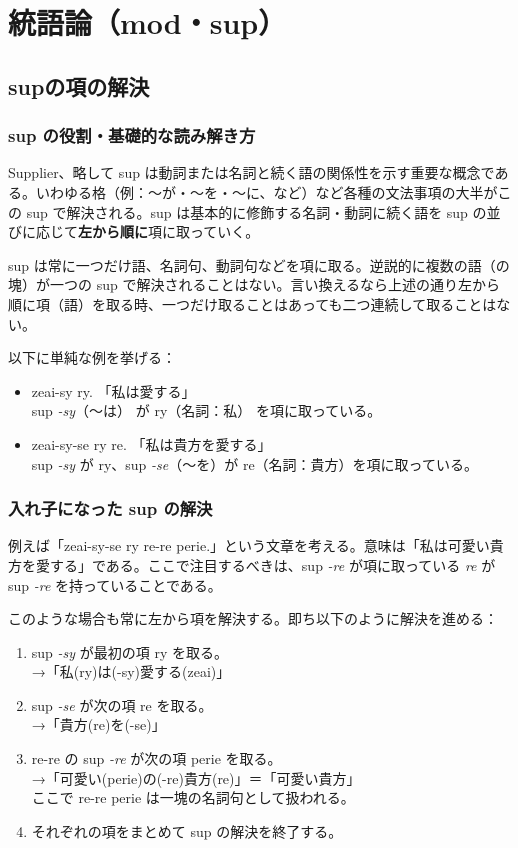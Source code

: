 \chapter{統語論（mod・sup）}

\section{supの項の解決}

\subsection{sup の役割・基礎的な読み解き方}

Supplier、略して sup は動詞または名詞と続く語の関係性を示す重要な概念である。いわゆる格（例：～が・～を・～に、など）など各種の文法事項の大半がこの sup で解決される。sup は基本的に修飾する名詞・動詞に続く語を sup の並びに応じて\textbf{左から順に}項に取っていく。

sup は常に一つだけ語、名詞句、動詞句などを項に取る。逆説的に複数の語（の塊）が一つの sup で解決されることはない。言い換えるなら上述の通り左から順に項（語）を取る時、一つだけ取ることはあっても二つ連続して取ることはない。

以下に単純な例を挙げる：

\begin{itemize}
    \item zeai-sy ry. 「私は愛する」\\ sup \emph{-sy}（～は） が ry（名詞：私） を項に取っている。
    \item zeai-sy-se ry re. 「私は貴方を愛する」\\ sup \emph{-sy} が ry、sup \emph{-se}（～を）が re（名詞：貴方）を項に取っている。
\end{itemize}

\subsection{入れ子になった sup の解決}

例えば「zeai-sy-se ry re-re perie.」という文章を考える。意味は「私は可愛い貴方を愛する」である。ここで注目するべきは、sup \emph{-re} が項に取っている \emph{re} が sup \emph{-re} を持っていることである。

このような場合も常に左から項を解決する。即ち以下のように解決を進める：

\begin{enumerate}
    \item sup \emph{-sy} が最初の項 ry を取る。\\ →「私(ry)は(-sy)愛する(zeai)」
    \item sup \emph{-se} が次の項 re を取る。 \\ →「貴方(re)を(-se)」
    \item re-re の sup \emph{-re} が次の項 perie を取る。 \\ →「可愛い(perie)の(-re)貴方(re)」＝「可愛い貴方」\\ ここで re-re perie は一塊の名詞句として扱われる。
    \item それぞれの項をまとめて sup の解決を終了する。
\end{enumerate}


